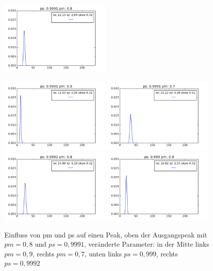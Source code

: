 \begin{figure}[H]
\begin{center}
\includegraphics[width=0.49\textwidth]{bilder/2s_t20}
\end{center}
\includegraphics[width=0.49\textwidth]{bilder/2s_t20_pmp}
\includegraphics[width=0.49\textwidth]{bilder/2s_t20_pmm}
\includegraphics[width=0.49\textwidth]{bilder/2s_t20_psp}
\includegraphics[width=0.49\textwidth]{bilder/2s_t20_psm}
\caption[Einfluss von pm und ps auf einen Peak]{Einfluss von pm und ps auf einen Peak, oben der Ausgangspeak mit $pm = 0,8$ und $ps = 0,9991$, veränderte Parameter: in der Mitte links $pm = 0,9$, rechts $pm = 0,7$, unten links $ps = 0,999$, rechts $ps = 0,9992$ }
\label{2s_t20_change}
\end{figure}

